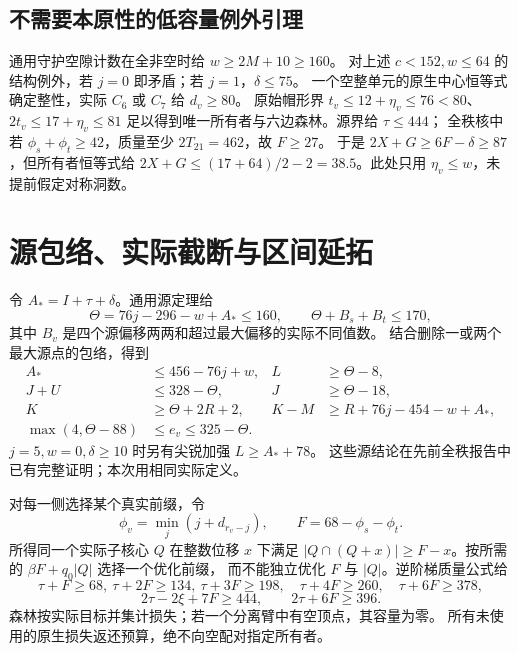 \documentclass[11pt,a4paper]{article}
\newcommand{\A}{A_*}
\begin{document}
\subsection{不需要本原性的低容量例外引理}
通用守护空隙计数在全非空时给 $w\ge2M+10\ge160$。
对上述 $c<152,w\le64$ 的结构例外，若 $j=0$ 即矛盾；若 $j=1$，$\delta\le75$。
一个空整单元的原生中心恒等式确定整性，实际 $C_6$ 或 $C_7$ 给 $d_v\ge80$。
原始帽形界 $t_v\le12+\eta_v\le76<80$、$2t_v\le17+\eta_v\le81$
足以得到唯一所有者与六边森林。源界给 $\tau\le444$；
全秩核中若 $\phi_s+\phi_t\ge42$，质量至少 $2T_{21}=462$，故 $F\ge27$。
于是 $2X+G\ge6F-\delta\ge87$，但所有者恒等式给
$2X+G\le(17+64)/2-2=38.5$。此处只用 $\eta_v\le w$，未提前假定对称洞数。

\section{源包络、实际截断与区间延拓}
令 $\A=I+\tau+\delta$。通用源定理给
\[
 \Theta=76j-296-w+\A\le160,\qquad\Theta+B_s+B_t\le170,
\]
其中 $B_v$ 是四个源偏移两两和超过最大偏移的实际不同值数。
结合删除一或两个最大源点的包络，得到
\begin{align}
 \A&\le456-76j+w,& L&\ge\Theta-8,\\
 J+U&\le328-\Theta,&J&\ge\Theta-18,\\
 K&\ge\Theta+2R+2,&K-M&\ge R+76j-454-w+\A,\\
 \max(4,\Theta-88)&\le e_v\le325-\Theta.&&
\end{align}
$j=5,w=0,\delta\ge10$ 时另有尖锐加强 $L\ge\A+78$。
这些源结论在先前全秩报告中已有完整证明；本次用相同实际定义。

对每一侧选择某个真实前缀，令
\[
 \phi_v=\min_j(j+d_{r_v-j}),\qquad F=68-\phi_s-\phi_t.
\]
所得同一个实际子核心 $Q$ 在整数位移 $x$ 下满足
$|Q\cap(Q+x)|\ge F-x$。按所需的 $\beta F+q_0|Q|$ 选择一个优化前缀，
而不能独立优化 $F$ 与 $|Q|$。逆阶梯质量公式给
\[
 \tau+F\ge68,\ \tau+2F\ge134,\ \tau+3F\ge198,
 \quad\tau+4F\ge260,\quad\tau+6F\ge378,
\]
\[
 2\tau-2\xi+7F\ge444,\qquad2\tau+6F\ge396.
\]
森林按实际目标并集计损失；若一个分离臂中有空顶点，其容量为零。
所有未使用的原生损失返还预算，绝不向空配对指定所有者。
\end{document}

